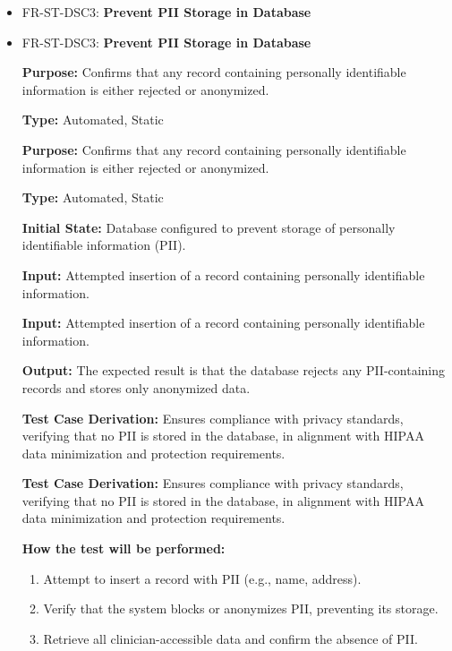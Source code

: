 \documentclass[12pt, titlepage]{article}
\begin{document}
\begin{itemize}
  \item FR-ST-DSC3: \textbf{Prevent PII Storage in Database}
  \item FR-ST-DSC3: \textbf{Prevent PII Storage in Database}
  \begin{mdframed}[linewidth=0.5mm]
      \textbf{Purpose:} Confirms that any record containing personally identifiable information is either rejected or anonymized. \par
      \textbf{Type:} Automated, Static \par
      \textbf{Purpose:} Confirms that any record containing personally identifiable information is either rejected or anonymized. \par
      \textbf{Type:} Automated, Static \par
      \textbf{Initial State:} Database configured to prevent storage of personally identifiable information (PII). \par
      \textbf{Input:} Attempted insertion of a record containing personally identifiable information. \par
      \textbf{Input:} Attempted insertion of a record containing personally identifiable information. \par
      \textbf{Output:} The expected result is that the database rejects any PII-containing records and stores only anonymized data. \par
      \textbf{Test Case Derivation:} Ensures compliance with privacy standards, verifying that no PII is stored in the database, in alignment with HIPAA data minimization and protection requirements. \par
      \textbf{Test Case Derivation:} Ensures compliance with privacy standards, verifying that no PII is stored in the database, in alignment with HIPAA data minimization and protection requirements. \par
      \textbf{How the test will be performed:}
      \begin{enumerate}[noitemsep]
        \item Attempt to insert a record with PII (e.g., name, address).
        \item Verify that the system blocks or anonymizes PII, preventing its storage.
        \item Retrieve all clinician-accessible data and confirm the absence of PII.
      \end{enumerate}
  \end{mdframed}


\end{itemize}
\end{document}
